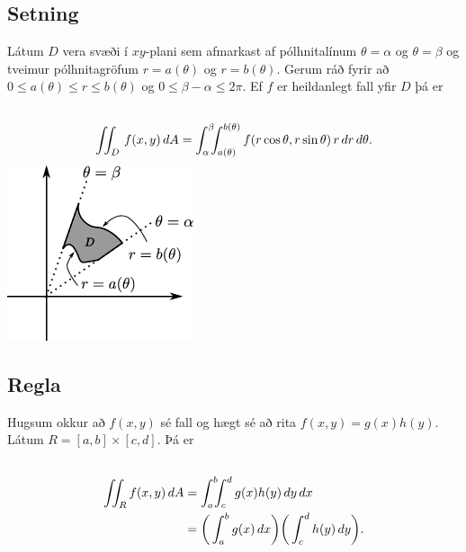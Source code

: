 \documentclass[a4paper,10pt,icelandic]{sphinxmanual}
\begin{document}
\subsection{Setning}
\label{Kafli4:id13}
Látum \(D\) vera svæði í \(xy\)-plani sem afmarkast af
pólhnitalínum \(\theta=\alpha\) og \(\theta=\beta\) og tveimur
pólhnitagröfum \(r=a(\theta)\) og \(r=b(\theta)\). Gerum ráð
fyrir að \(0\leq a(\theta)\leq
r\leq b(\theta)\) og \(0\leq \beta-\alpha\leq 2\pi\). Ef \(f\) er
heildanlegt fall yfir \(D\) þá er
\begin{gather}
\begin{split}\displaystyle\end{split}\notag\\\begin{split}\int\!\!\!\int_D\,f(x,y)\,dA=\int_\alpha^\beta\!\!\!\int_{a(\theta)}^{b(\theta)}
f(r\cos\theta,r\sin\theta)\,r\,dr\, d\theta.\end{split}\notag
\end{gather}
{\hfill\includegraphics[width=0.450\linewidth]{polarsvaedi.png}\hfill}


\subsection{Regla}
\label{Kafli4:id14}
Hugsum okkur að \(f(x,y)\) sé fall og hægt sé að rita
\(f(x,y)=g(x)h(y)\). Látum \(R=[a,b]\times [c,d]\). Þá er
\begin{gather}
\begin{split}\displaystyle\end{split}\notag\\\begin{split}\begin{aligned}
\int\!\!\!\int_R f(x,y)\,dA&=\int_a^b\!\!\!\int_{c}^{d}g(x)h(y)\,dy\, dx\\
&=\bigg(\int_a^b g(x)\,dx\bigg)\bigg(\int_c^d h(y)\,dy\bigg).\end{aligned}\end{split}\notag
\end{gather}
\end{document}
